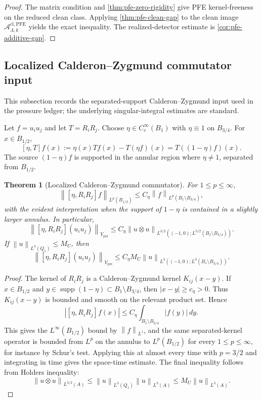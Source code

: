 \documentclass[11pt]{article}
\numberwithin{equation}{section}
\theoremstyle{plain}
\newtheorem{theorem}{Theorem}[section]
\theoremstyle{definition}
\theoremstyle{remark}
\newcommand{\cl}{\mathrm{cl}}
\newcommand{\prs}{\mathrm{prs}}
\newcommand{\supp}{\operatorname{supp}}
\newcommand{\A}{\mathcal A}
\newcommand{\norm}[1]{\left\lVert #1\right\rVert}
\newcommand{\abs}[1]{\left\lvert #1\right\rvert}
\begin{document}
\begin{proof}
The matrix condition and \cref{thm:pfe-zero-rigidity} give PFE
kernel-freeness on the reduced clean class.  Applying
\cref{thm:pfe-clean-gap} to the clean image
\(\A_{\Lambda,k}^{\cl,\mathrm{PFE}}\) yields the exact inequality.  The
realized-detector estimate is \cref{cor:pfe-additive-gap}.
\end{proof}

\subsection{Localized Calderon--Zygmund commutator input}

This subsection records the separated-support Calderon--Zygmund input used in the pressure ledger; the underlying singular-integral estimates are standard.

Let \(f=u_i u_j\) and let \(T=R_iR_j\).  Choose
\(\eta\in C_c^\infty(B_1)\) with \(\eta\equiv1\) on \(B_{3/4}\).  For
\(x\in B_{1/2}\),
\[
  [\eta,T]f(x):=\eta(x)Tf(x)-T(\eta f)(x)
  =T((1-\eta)f)(x).
\]
The source \((1-\eta)f\) is supported in the annular region where
\(\eta\ne1\), separated from \(B_{1/2}\).

\begin{theorem}[Localized Calderon--Zygmund commutator]\label{thm:cz-comm}
For \(1\le p\le\infty\),
\[
  \norm{[\eta,R_iR_j]f}_{L^p(B_{1/2})}
  \le
  C_\eta\norm{f}_{L^p(B_1\setminus B_{3/4})},
\]
with the evident interpretation when the support of \(1-\eta\) is contained
in a slightly larger annulus.  In particular,
\[
  \norm{[\eta,R_iR_j](u_i u_j)}_{Y_{\prs}}
  \le
  C_\eta
  \norm{u\otimes u}_{L^{3/2}((-1,0);L^{3/2}(B_1\setminus B_{3/4}))}.
\]
If \(\norm{u}_{L^3(Q_1)}\le M_U\), then
\[
  \norm{[\eta,R_iR_j](u_i u_j)}_{Y_{\prs}}
  \le
  C_\eta M_U
  \norm{u}_{L^3((-1,0);L^3(B_1\setminus B_{3/4}))}.
\]
\end{theorem}

\begin{proof}
The kernel of \(R_iR_j\) is a Calderon--Zygmund kernel \(K_{ij}(x-y)\).  If
\(x\in B_{1/2}\) and \(y\in\supp(1-\eta)\subset B_1\setminus B_{3/4}\), then
\(\abs{x-y}\ge c_\eta>0\).  Thus \(K_{ij}(x-y)\) is bounded and smooth on
the relevant product set.  Hence
\[
  \abs{[\eta,R_iR_j]f(x)}
  \le
  C_\eta\int_{B_1\setminus B_{3/4}}\abs{f(y)}\,dy.
\]
This gives the \(L^\infty(B_{1/2})\) bound by \(\norm{f}_{L^1}\), and the
same separated-kernel operator is bounded from \(L^p\) on the annulus to
\(L^p(B_{1/2})\) for every \(1\le p\le\infty\), for instance by Schur's
test.  Applying this at almost every time with \(p=3/2\) and integrating in
time gives the space-time estimate.  The final inequality follows from
Holders inequality:
\[
  \norm{u\otimes u}_{L^{3/2}(A)}
  \le
  \norm{u}_{L^3(Q_1)}\norm{u}_{L^3(A)}
  \le
  M_U\norm{u}_{L^3(A)}.
\]
\end{proof}
\end{document}
